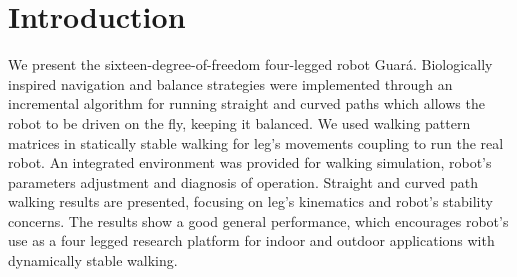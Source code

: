 \section{Introduction}
\label{intro}
	We present the sixteen-degree-of-freedom four-legged robot Guar\'a. Biologically inspired navigation and balance strategies were implemented through an incremental algorithm for running straight and curved paths which allows the robot to be driven on the fly, keeping it balanced. We used walking pattern matrices in statically stable walking for leg's movements coupling to run the real robot. An integrated environment was provided for walking simulation, robot's parameters adjustment and diagnosis of operation. Straight and curved path  walking results are presented, focusing on leg's kinematics and robot's stability concerns. The results show a good general performance, which encourages robot's use as a four legged research platform for indoor and outdoor applications with dynamically stable walking.
